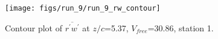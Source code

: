 \begin{figure}[H]
\centering
\texttt{[image: figs/run\_9/run\_9\_rw\_contour]}
\caption{Contour plot of $\overline{r^\prime w^\prime}$ at $z/c$=5.37, $V_{free}$=30.86, station 1.}
\label{fig:run_9_rw_contour}
\end{figure}


